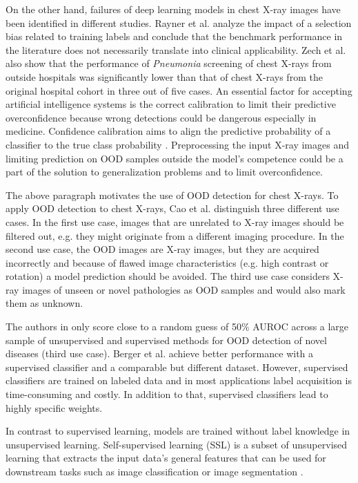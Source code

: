 On the other hand, failures of deep learning models in chest X-ray images have been identified in different studies.
Rayner et al. \citep{Rayner2019} analyze the impact of a selection bias related to training labels and conclude that the benchmark performance in the literature does not necessarily translate into clinical applicability.
Zech et al. \citep{Zech2018} also show that the performance of \textit{Pneumonia} screening of chest X-rays from outside hospitals was significantly lower than that of chest X-rays from the original hospital cohort in three out of five cases.
An essential factor for accepting artificial intelligence systems is the correct calibration to limit their predictive overconfidence because wrong detections could be dangerous especially in medicine.
Confidence calibration aims to align the predictive probability of a classifier to the true class probability \citep{Guo2017}.
Preprocessing the input X-ray images and limiting prediction on OOD samples outside the model's competence could be a part of the solution to generalization problems and to limit overconfidence.
\par
The above paragraph motivates the use of OOD detection for chest X-rays.
To apply OOD detection to chest X-rays, Cao et al. \citep{Cao2020} distinguish three different use cases.
In the first use case, images that are unrelated to X-ray images should be filtered out, e.g. they might originate from a different imaging procedure.
In the second use case, the OOD images are X-ray images, but they are acquired incorrectly and because of flawed image characteristics (e.g. high contrast or rotation) a model prediction should be avoided.
The third use case considers X-ray images of unseen or novel pathologies as OOD samples and would also mark them as unknown.
\par
The authors in \citep{Cao2020} only score close to a random guess of 50\% AUROC across a large sample of unsupervised and supervised methods for OOD detection of novel diseases (third use case).
Berger et al. \citep{Berger2021} achieve better performance with a supervised classifier and a comparable but different dataset.
However, supervised classifiers are trained on labeled data and in most applications label acquisition is time-consuming and costly.
In addition to that, supervised classifiers lead to highly specific weights.
\par
In contrast to supervised learning, models are trained without label knowledge in unsupervised learning.
Self-supervised learning (SSL) is a subset of unsupervised learning that extracts the input data's general features that can be used for downstream tasks such as image classification or image segmentation \citep{Jing2019}.
